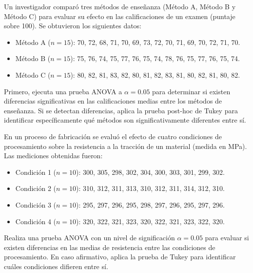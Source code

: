 \documentclass[addpoints,12pt]{exam}
\theoremstyle{plain}
\theoremstyle{remark}
\theoremstyle{definition}
\begin{document}
\begin{questions}
 \question  Un investigador comparó tres métodos de enseñanza (Método A, Método B y Método C) para evaluar su efecto en las calificaciones de un examen (puntaje sobre 100). Se obtuvieron los siguientes datos:
    \begin{itemize}
        \item Método A (\(n=15\)): 70, 72, 68, 71, 70, 69, 73, 72, 70, 71, 69, 70, 72, 71, 70.
        \item Método B (\(n=15\)): 75, 76, 74, 75, 77, 76, 75, 74, 78, 76, 75, 77, 76, 75, 74.
        \item Método C (\(n=15\)): 80, 82, 81, 83, 82, 80, 81, 82, 83, 81, 80, 82, 81, 80, 82.
    \end{itemize}
    Primero, ejecuta una prueba ANOVA a \(\alpha = 0.05\) para determinar si existen diferencias significativas en las calificaciones medias entre los métodos de enseñanza. Si se detectan diferencias, aplica la prueba post-hoc de Tukey para identificar específicamente qué métodos son significativamente diferentes entre sí.

 \question   En un proceso de fabricación se evaluó el efecto de cuatro condiciones de procesamiento sobre la resistencia a la tracción de un material (medida en MPa). Las mediciones obtenidas fueron:
    \begin{itemize}
        \item Condición 1 (\(n=10\)): 300, 305, 298, 302, 304, 300, 303, 301, 299, 302.
        \item Condición 2 (\(n=10\)): 310, 312, 311, 313, 310, 312, 311, 314, 312, 310.
        \item Condición 3 (\(n=10\)): 295, 297, 296, 295, 298, 297, 296, 295, 297, 296.
        \item Condición 4 (\(n=10\)): 320, 322, 321, 323, 320, 322, 321, 323, 322, 320.
    \end{itemize}
    Realiza una prueba ANOVA con un nivel de significación \(\alpha = 0.05\) para evaluar si existen diferencias en las medias de resistencia entre las condiciones de procesamiento. En caso afirmativo, aplica la prueba de Tukey para identificar cuáles condiciones difieren entre sí.

\end{questions}
\end{document}
